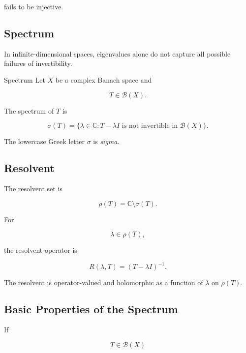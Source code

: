 fails to be injective.

\subsection{Spectrum}
\label{subsec:spectrum-operator}

In infinite-dimensional spaces, eigenvalues alone do not capture all
possible failures of invertibility.

\begin{definitionbox}{Spectrum}
Let \(X\) be a complex Banach space and

\[
T\in\mathcal{B}(X).
\]

The spectrum of \(T\) is

\[
\boxed{
\sigma(T)
=
\{
\lambda\in\mathbb{C}:
T-\lambda I
\text{ is not invertible in }\mathcal{B}(X)
\}.
}
\]
\end{definitionbox}

The lowercase Greek letter \(\sigma\) is \emph{sigma}.

\subsection{Resolvent}
\label{subsec:resolvent-operator}

The resolvent set is

\[
\boxed{
\rho(T)
=
\mathbb{C}\setminus\sigma(T).
}
\]

For

\[
\lambda\in\rho(T),
\]

the resolvent operator is

\[
\boxed{
R(\lambda,T)
=
(T-\lambda I)^{-1}.
}
\]

The resolvent is operator-valued and holomorphic as a function of
\(\lambda\) on \(\rho(T)\).

\subsection{Basic Properties of the Spectrum}
\label{subsec:basic-spectrum-properties}

If

\[
T\in\mathcal{B}(X)
\]

